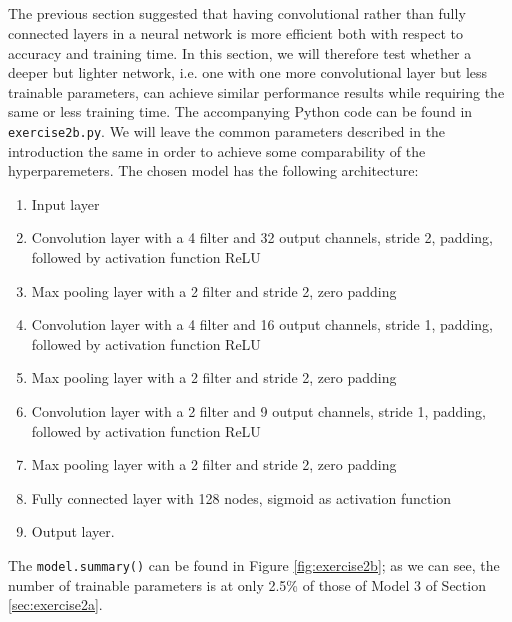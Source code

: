 \documentclass[12pt]{article}
\newcommand{\exercisetwob}{\texttt{exercise2b.py}\;}
\begin{document}
\subsection{}

The previous section suggested that having convolutional rather than fully connected layers in a neural network is more efficient both with respect to accuracy and training time. In this section, we will therefore test whether a deeper but lighter network, i.e. one with one more convolutional layer but less trainable parameters, can achieve similar performance results while requiring the same or less training time. The accompanying Python code can be found in \exercisetwob. We will leave the common parameters described in the introduction the same in order to achieve some comparability of the hyperparemeters. The chosen model has the following architecture: \\

\begin{enumerate}[nolistsep]
\item Input layer
\item Convolution layer with a 4 filter and 32 output channels, stride 2, padding, followed by activation function ReLU
\item Max pooling layer with a 2 filter and stride 2, zero padding
\item Convolution layer with a 4 filter and 16 output channels, stride 1, padding, followed by activation function ReLU
\item Max pooling layer with a 2 filter and stride 2, zero padding
\item Convolution layer with a 2 filter and 9 output channels, stride 1, padding, followed by activation function ReLU
\item Max pooling layer with a 2 filter and stride 2, zero padding
\item Fully connected layer with 128 nodes, sigmoid as activation function
\item Output layer.\\
\end{enumerate}

\noindent The \texttt{model.summary()} can be found in Figure \ref{fig:exercise2b}; as we can see, the number of trainable parameters is at only 2.5\% of those of Model 3 of Section \ref{sec:exercise2a}. 
\end{document}
